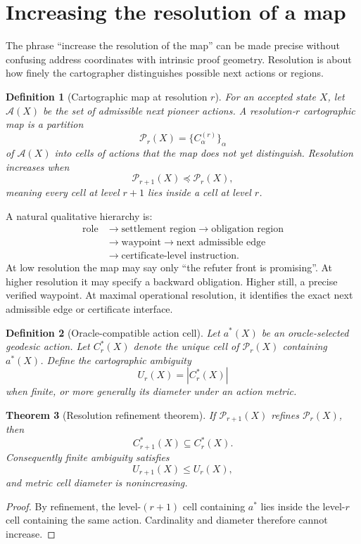 \documentclass[11pt]{article}
\newtheorem{definition}{Definition}[section]
\newtheorem{theorem}[definition]{Theorem}
\theoremstyle{remark}
\begin{document}
\section{Increasing the resolution of a map}

The phrase ``increase the resolution of the map'' can be made precise without confusing address coordinates with intrinsic proof geometry. Resolution is about how finely the cartographer distinguishes possible next actions or regions.

\begin{definition}[Cartographic map at resolution $r$]
For an accepted state $X$, let $\mathcal A(X)$ be the set of admissible next pioneer actions. A resolution-$r$ cartographic map is a partition
\[
\mathcal P_r(X)=\{C^{(r)}_\alpha\}_\alpha
\]
of $\mathcal A(X)$ into cells of actions that the map does not yet distinguish. Resolution increases when
\[
\mathcal P_{r+1}(X)\preceq \mathcal P_r(X),
\]
meaning every cell at level $r+1$ lies inside a cell at level $r$.
\end{definition}

A natural qualitative hierarchy is:
\[
\begin{aligned}
\boxed{\text{role}}&\to\boxed{\text{settlement region}}\to\boxed{\text{obligation region}}\\
&\to\boxed{\text{waypoint}}\to\boxed{\text{next admissible edge}}\\
&\to\boxed{\text{certificate-level instruction}}.
\end{aligned}
\]
At low resolution the map may say only ``the refuter front is promising''. At higher resolution it may specify a backward obligation. Higher still, a precise verified waypoint. At maximal operational resolution, it identifies the exact next admissible edge or certificate interface.

\begin{definition}[Oracle-compatible action cell]
Let $a^*(X)$ be an oracle-selected geodesic action. Let $C_r^*(X)$ denote the unique cell of $\mathcal P_r(X)$ containing $a^*(X)$. Define the cartographic ambiguity
\[
U_r(X)=|C_r^*(X)|
\]
when finite, or more generally its diameter under an action metric.
\end{definition}

\begin{theorem}[Resolution refinement theorem]
If $\mathcal P_{r+1}(X)$ refines $\mathcal P_r(X)$, then
\[
C_{r+1}^*(X)\subseteq C_r^*(X).
\]
Consequently finite ambiguity satisfies
\[
U_{r+1}(X)\le U_r(X),
\]
and metric cell diameter is nonincreasing.
\end{theorem}
\begin{proof}
By refinement, the level-$(r+1)$ cell containing $a^*$ lies inside the level-$r$ cell containing the same action. Cardinality and diameter therefore cannot increase.
\end{proof}
\end{document}
